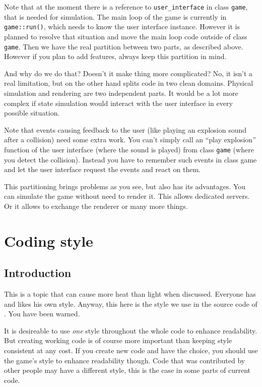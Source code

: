 \documentclass{report}
\begin{document}
Note that at the moment there is a reference to \texttt{user\_interface}
in class \texttt{game}, that is needed for simulation. The main loop of
the game is currently in \texttt{game::run()}, which needs to know the
user interface instance. However it is planned to resolve that situation
and move the main loop code outside of class \texttt{game}. Then we have
the real partition between two parts, as described above. However if you
plan to add features, always keep this partition in mind.

And why do we do that? Doesn't it make thing more complicated? No, it
isn't a real limitation, but on the other hand splits code in two clean
domains. Physical simulation and rendering are two independent parts. It
would be a lot more complex if state simulation would interact with the
user interface in every possible situation.

Note that events causing feedback to the user (like playing an explosion
sound after a collision) need some extra work. You can't simply call an
``play explosion'' function of the user interface (where the sound is
played) from class \texttt{game} (where you detect the collision).
Instead you have to remember such events in class game and let the user
interface request the events and react on them.

This partitioning brings problems as you see, but also has its
advantages. You can simulate the game without need to render it. This
allows dedicated servers. Or it allows to exchange the renderer or many
more things.


\section{Coding style}

\subsection{Introduction}
This is a topic that can cause more heat than light when discussed.
Everyone has and likes his own style. Anyway, this here is the style we
use in the source code of \dftd. You have been warned.

It is desireable to use \emph{one} style throughout the whole code to
enhance readability. But creating working code is of course more
important than keeping style consistent at any cost. If you create new
code and have the choice, you should use the game's style to enhance
readability though.  Code that was contributed by other people may have
a different style, this is the case in some parts of current code.
\end{document}
